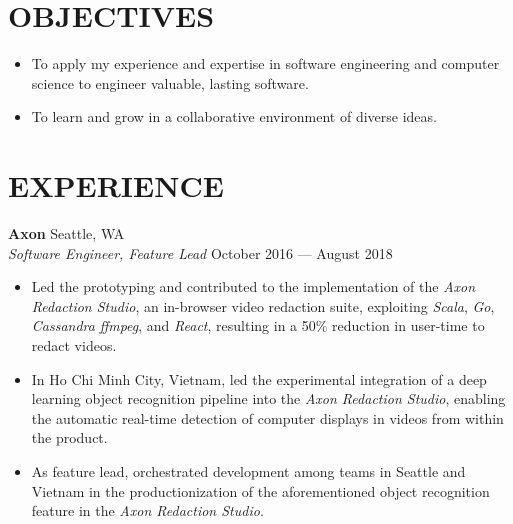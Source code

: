 \documentclass[line,margin]{res}
\begin{document}
\address{wilsoniya@gmail.com}
\address{(312) 404--0425}

\begin{resume}


\section{OBJECTIVES}
    \begin{itemize} \itemsep -2pt
        \item To apply my experience and expertise in software engineering and
            computer science to engineer valuable, lasting software.
        \item To learn and grow in a collaborative environment of diverse
            ideas.
    \end{itemize}


\section{EXPERIENCE}
    \textbf{Axon} \hfill Seattle, WA \\
    \textit{Software Engineer, Feature Lead}
    \hfill October 2016 --- August 2018
        \begin{itemize}  \itemsep -2pt
            \item Led the prototyping and contributed to the implementation of
                the \textit{Axon Redaction Studio}, an in-browser video
                redaction suite, exploiting \textit{Scala}, \textit{Go},
                \textit{Cassandra} \textit{ffmpeg}, and \textit{React},
                resulting in a 50\% reduction in user-time to redact videos.
            \item In Ho Chi Minh City, Vietnam, led the experimental
                integration of a deep learning object recognition pipeline into
                the \textit{Axon Redaction Studio}, enabling the automatic
                real-time detection of computer displays in videos from within
                the product.
            \item As feature lead, orchestrated development among teams in
                Seattle and Vietnam in the productionization of the
                aforementioned object recognition feature in the \textit{Axon
                Redaction Studio}.
        \end{itemize}


\end{resume}
\end{document}
